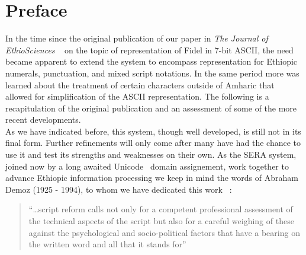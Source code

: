 
%
%
\section*{Preface}
In the time since the original publication of our paper
in \emph{The Journal of EthioSciences} ~\cite{EthioSci} on the
topic of representation of Fidel in 7-bit ASCII, the need
became apparent to extend the system to encompass
representation for Ethiopic numerals, punctuation, and mixed
script notations.  In the same period more was learned about
the treatment of certain characters outside of Amharic that
allowed for simplification of the ASCII representation.  The
following is a recapitulation of the original publication and
an assessment of some of the more recent developments.  \\

As we have indicated before, this system, though well
developed, is still not in its final form.  Further refinements
will only come after many have had the chance to use it and
test its strengths and weaknesses on their own.  As the SERA
system, joined now by a long awaited Unicode~\cite{Uni2} domain assignement, 
work together to advance Ethiopic information processing
we keep in mind the words of Abraham Demoz (1925 - 1994), to whom 
we have dedicated this work ~\cite{Demoz}:
\begin{quote}
	``\ldots script reform calls not only for a competent
	professional assessment of the technical aspects of
	the script but also for a careful weighing of these
	against the psychological and socio-political factors
	that have a bearing on the written word and all that
	it stands for''
\end{quote}

%






%
%
%
